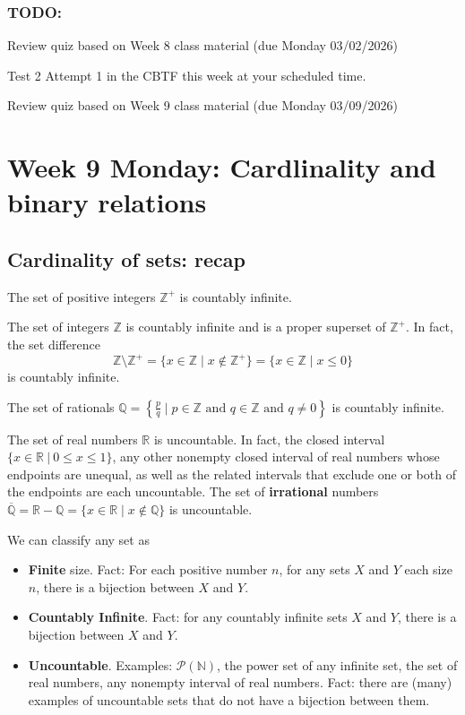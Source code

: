 \documentclass[12pt, oneside]{article}
\begin{document}
\subsubsection*{TODO:}
\begin{list}
   {\itemsep2pt}
    \item Review quiz based on Week 8 class material (due Monday 03/02/2026)
    \item Test 2 Attempt 1 in the CBTF this week at your scheduled time.
    \item Review quiz based on Week 9 class material (due Monday 03/09/2026)

\end{list}

\newpage
\section*{Week 9 Monday: Cardlinality and binary relations}

\subsection*{Cardinality of sets: recap}



The set of positive integers $\mathbb{Z}^{+}$ is countably infinite.

The set of integers $\mathbb{Z}$ is countably infinite and is a proper superset of $\mathbb{Z}^{+}$. 
In fact, the set difference 
$$\mathbb{Z} \setminus \mathbb{Z}^{+} = \{ x \in \mathbb{Z} \mid x \notin \mathbb{Z}^+\} 
= \{ x \in \mathbb{Z} \mid x \leq 0 \}$$ is countably infinite.

The set of rationals 
$\mathbb{Q} = \left\{ \frac{p}{q} \mid p \in \mathbb{Z}  \text{ and  } 
q  \in \mathbb{Z} \text{ and } q \neq  0 \right\}$ is countably infinite.


The set of real numbers $\mathbb{R}$ is uncountable. In fact, the closed 
interval $\{x \in \mathbb{R} ~|~ 0 \leq x \leq 1\}$, 
any other nonempty closed interval of real numbers whose endpoints are 
unequal, as well as the related intervals that exclude one or both of the endpoints are
each uncountable.
The set of {\bf irrational} numbers $\overline{\mathbb{Q}} = \mathbb{R} - \mathbb{Q}
= \{ x \in \mathbb{R} \mid x \notin \mathbb{Q} \}$ is uncountable.

\vfill

We can classify any set as 
\begin{itemize}
\item {\bf Finite} size. Fact: For each positive number $n$, for any sets $X$ and $Y$ each 
size $n$, there is a bijection between $X$ and $Y$.
\item {\bf Countably Infinite}. Fact: for any countably infinite sets $X$ and $Y$, there is a bijection
between $X$ and $Y$.
\item {\bf Uncountable}. Examples: $\mathcal{P}(\mathbb{N})$, the power set of any infinite set, 
the set of real numbers, any nonempty interval of real numbers. Fact: there are (many) examples 
of uncountable sets that do not have a bijection between them.
\end{itemize} \newpage
\end{document}

